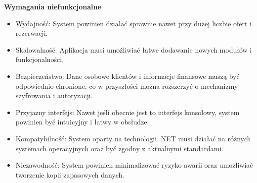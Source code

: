 \noindent \textbf{Wymagania niefunkcjonalne }
\begin{itemize}
    \item Wydajność: System powinien działać sprawnie nawet przy dużej liczbie ofert i rezerwacji. 
    \item Skalowalność: Aplikacja musi umożliwiać łatwe dodawanie nowych modułów i funkcjonalności.
    \item Bezpieczeństwo: Dane osobowe klientów i informacje finansowe muszą być odpowiednio chronione, co w przyszłości można rozszerzyć o mechanizmy szyfrowania i autoryzacji.
    \item Przyjazny interfejs: Nawet jeśli obecnie jest to interfejs konsolowy, system powinien być intuicyjny i łatwy w obsłudze.
    \item Kompatybilność: System oparty na technologii .NET musi działać na różnych systemach operacyjnych oraz być zgodny z aktualnymi standardami.
    \item Niezawodność: System powinien minimalizować ryzyko awarii oraz umożliwiać tworzenie kopii zapasowych danych.
\end{itemize}
 


